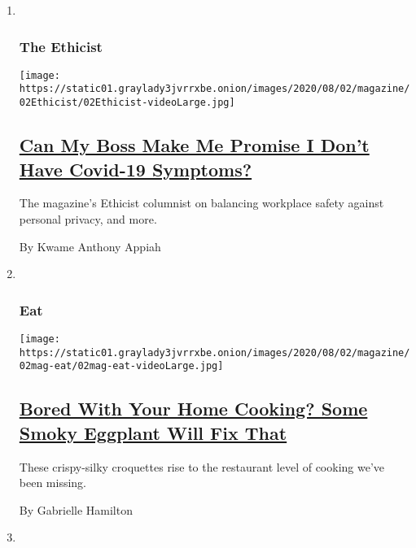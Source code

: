 \begin{enumerate}
\def\labelenumi{\arabic{enumi}.}
\item ~
  \hypertarget{the-ethicist}{%
  \subsubsection{The Ethicist}\label{the-ethicist}}

  \texttt{[image: https://static01.graylady3jvrrxbe.onion/images/2020/08/02/magazine/02Ethicist/02Ethicist-videoLarge.jpg]}

  \hypertarget{can-my-boss-make-me-promise-i-dont-have-covid-19-symptoms}{%
  \subsection{\texorpdfstring{\href{/2020/07/28/magazine/can-my-boss-make-me-promise-i-dont-have-covid-19-symptoms.html}{Can
  My Boss Make Me Promise I Don't Have Covid-19
  Symptoms?}}{Can My Boss Make Me Promise I Don't Have Covid-19 Symptoms?}}\label{can-my-boss-make-me-promise-i-dont-have-covid-19-symptoms}}

  The magazine's Ethicist columnist on balancing workplace safety
  against personal privacy, and more.

  By Kwame Anthony Appiah
\item ~
  \hypertarget{eat}{%
  \subsubsection{Eat}\label{eat}}

  \texttt{[image: https://static01.graylady3jvrrxbe.onion/images/2020/08/02/magazine/02mag-eat/02mag-eat-videoLarge.jpg]}

  \hypertarget{bored-with-your-home-cooking-some-smoky-eggplant-will-fix-that}{%
  \subsection{\texorpdfstring{\href{/2020/07/29/magazine/bored-with-your-home-cooking-some-smoky-eggplant-will-fix-that.html}{Bored
  With Your Home Cooking? Some Smoky Eggplant Will Fix
  That}}{Bored With Your Home Cooking? Some Smoky Eggplant Will Fix That}}\label{bored-with-your-home-cooking-some-smoky-eggplant-will-fix-that}}

  These crispy-silky croquettes rise to the restaurant level of cooking
  we've been missing.

  By Gabrielle Hamilton
\item ~
  \hypertarget{talk-1}{%
}
\end{enumerate}
